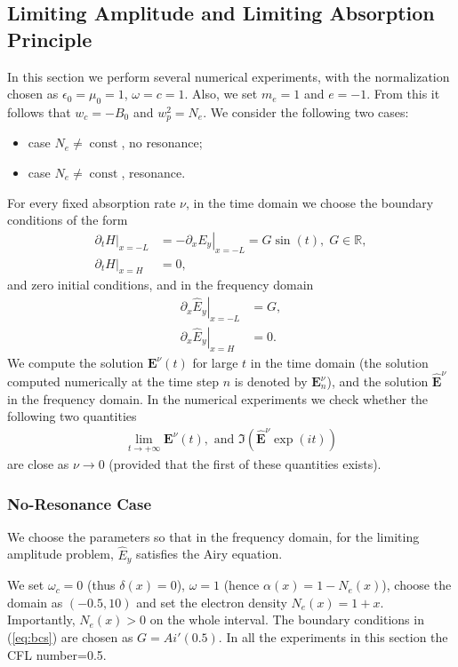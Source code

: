 \subsection{Limiting Amplitude and Limiting Absorption Principle}
In this section we perform several numerical experiments,
with the normalization chosen as $\epsilon_0=\mu_0=1$, $\omega=c=1$. 
Also, we set $m_e=1$ and $e=-1$. From this it follows that $w_c=-B_0$ and $w_p^2=N_e$. 
We consider the following two cases:
\begin{itemize}
 \item case $N_e\neq \operatorname{const}$, no resonance;
 \item case $N_e\neq \operatorname{const}$, resonance.
\end{itemize}
For every fixed absorption rate $\nu$, in the time domain we choose the boundary conditions of the form
\begin{align}
\label{eq:bcs}
\left.\partial_t H\right|_{x=-L}&=-\left.\partial_x E_y\right|_{x=-L}=G\sin(t),\; G\in \mathbb{R}, \\
 \nonumber
 \left.\partial_t H\right|_{x=H}&=0,
\end{align}
and zero initial conditions, and in the frequency domain
\begin{align*}
 \left.\partial_x \hat{E}_y\right|_{x=-L}&=G,\\
 \left.\partial_x \hat{E}_y\right|_{x=H}&=0.
\end{align*}
We compute the solution $\mathbf{E}^{\nu}(t)$ for large $t$ in the time domain (the solution computed numerically at the time step $n$ is denoted by $\mathbf{E}^{\nu}_{n}$), and the solution $\hat{\mathbf{E}}^{\nu}$ in the frequency domain. 
In the numerical experiments we check whether the following two quantities
\begin{align*}
\lim_{t\rightarrow+\infty}\mathbf{E}^{\nu}(t), \text{ and } \Im\left(\hat{\mathbf{E}}^{\nu}\exp(it)\right)
\end{align*}
are close as $\nu\rightarrow 0$ (provided that the first of these quantities exists). 
\subsubsection{No-Resonance Case}
We choose the parameters so that in the frequency domain, for the limiting amplitude problem, $\hat{E}_{y}$ satisfies 
the Airy equation. 

We set $\omega_c=0$ (thus $\delta(x)=0$), $\omega=1$ (hence $\alpha(x)=1-N_e(x)$), 
choose the domain as $(-0.5, 10)$ and set the electron density $N_e(x)=1+x$. Importantly, $N_e(x)>0$ on the whole interval.
The boundary conditions in (\ref{eq:bcs}) are chosen as $G=Ai'(0.5)$. 
In all the experiments in this section the CFL number=0.5.


